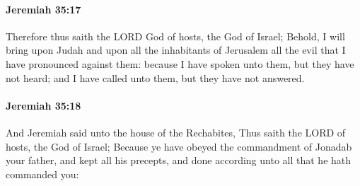 		\paragraph{Jeremiah 35:17} %
			\label{JEREMIAH-35-17}

			Therefore thus saith the LORD God of hosts, the God of Israel; Behold, I will bring upon Judah and upon all the inhabitants of Jerusalem all the evil that I have pronounced against them: because I have spoken unto them, but they have not heard; and I have called unto them, but they have not answered.


		\paragraph{Jeremiah 35:18} %
			\label{JEREMIAH-35-18}

			And Jeremiah said unto the house of the Rechabites, Thus saith the LORD of hosts, the God of Israel; Because ye have obeyed the commandment of Jonadab your father, and kept all his precepts, and done according unto all that he hath commanded you:

